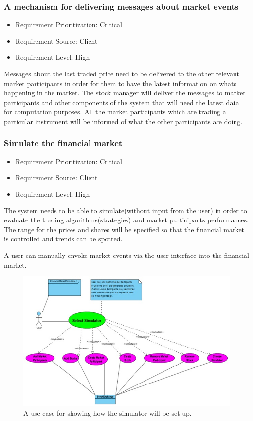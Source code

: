 \documentclass[12pt]{article}
\begin{document}
			\subsubsection{A mechanism for delivering messages about market events}
			\begin{itemize}
					\item Requirement Prioritization: Critical
					\item Requirement Source: Client 
					\item Requirement Level: High	
			\end{itemize}
			
			Messages about the last traded price need to be delivered to the other relevant market participants in order for them to have the latest information on whats happening in the market. The stock manager will deliver the messages to market participants and other components of the system that will need the latest data for computation purposes. All the market participants which are trading a particular instrument will be informed of what the other participants are doing.
	\pagebreak		
			\subsubsection{Simulate the financial market}
			\begin{itemize}
				\item Requirement Prioritization: Critical
				\item Requirement Source: Client 
				\item Requirement Level: High	
			\end{itemize}
						
			The system needs to be able to simulate(without input from the user) in order to evaluate the trading algorithms(strategies) and market participants performances. The range for the prices and shares will be specified so that the financial market is controlled and trends can be spotted. 
			
			A user can manually envoke market events via the user interface into the financial market.
			
			\begin{figure}[th]
			\centering
			\includegraphics[scale=0.8]{./USE_CASE_Select_Simulator_Financial_Market_Simulator}
			\caption{A use case for showing how the simulator will be set up.}
			\label{domain objects}
			\end{figure}
				
\end{document}
